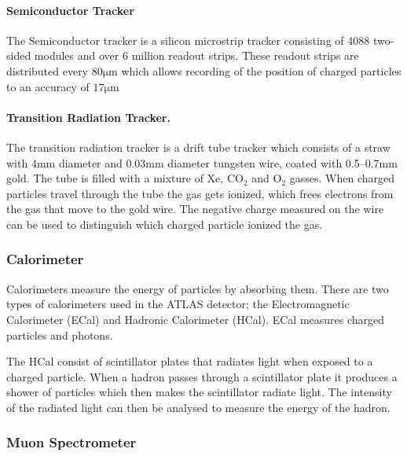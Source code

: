 \documentclass[12pt,a4paper]{article}
\numberwithin{equation}{section}
\begin{document}
\paragraph{Semiconductor Tracker}
The Semiconductor tracker is a silicon microstrip tracker consisting of 4088
two-sided modules and over 6 million readout strips. These readout strips are
distributed every $80\mathrm{\mu m}$ which allows recording of the position of
charged particles to an accuracy of $17\mathrm{\mu m}$

\paragraph{Transition Radiation Tracker.}
The transition radiation tracker is a drift tube tracker which consists of a
straw with 4mm diameter and 0.03mm diameter tungsten wire, coated with 0.5--0.7mm
gold. The tube is filled with a mixture of Xe, $\mathrm{CO_2}$ and
$\mathrm{O_2}$ gasses. When charged particles travel through the tube the gas
gets ionized, which frees electrons from the gas that move to the gold wire. The
negative charge measured on the wire can be used to distinguish which charged
particle ionized the gas. \cite{ATLAS-ID}


\subsubsection{Calorimeter}
Calorimeters measure the energy of particles by absorbing them. There are two
types of calorimeters used in the ATLAS detector; the Electromagnetic
Calorimeter (ECal) and Hadronic Calorimeter (HCal). ECal measures charged
particles and photons.


The HCal consist of scintillator plates that radiates light when exposed to a
charged particle. When a hadron passes through a scintillator plate it produces
a shower of particles which then makes the scintillator radiate light. The
intensity of the radiated light can then be analysed to measure the energy of
the hadron. \cite{detector-vid}


\subsubsection{Muon Spectrometer}
\end{document}
